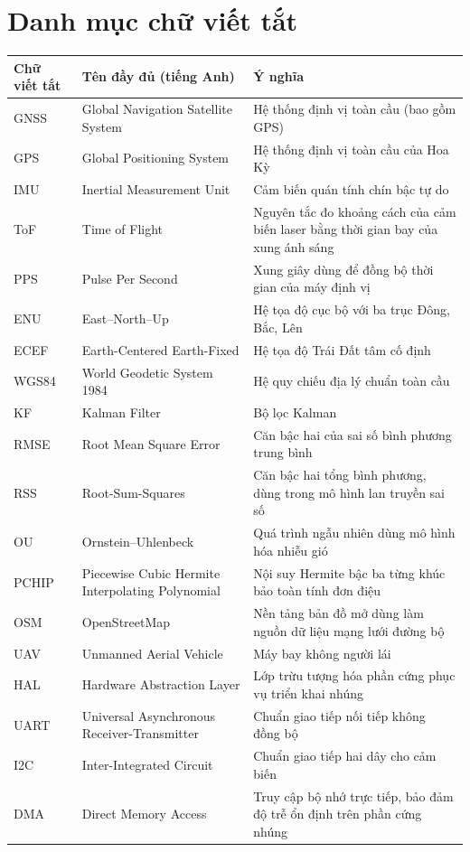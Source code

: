 \section*{Danh mục chữ viết tắt}
\thispagestyle{empty}

\begin{table}[H]
\centering
\small
\begin{tabularx}{\textwidth}{l>{\raggedright\arraybackslash}p{6.2cm}X}
\toprule
\textbf{Chữ viết tắt} & \textbf{Tên đầy đủ (tiếng Anh)} & \textbf{Ý nghĩa} \\
\midrule
GNSS & Global Navigation Satellite System & Hệ thống định vị toàn cầu (bao gồm GPS) \\
GPS & Global Positioning System & Hệ thống định vị toàn cầu của Hoa Kỳ \\
IMU & Inertial Measurement Unit & Cảm biến quán tính chín bậc tự do \\
ToF & Time of Flight & Nguyên tắc đo khoảng cách của cảm biến laser bằng thời gian bay của xung ánh sáng \\
PPS & Pulse Per Second & Xung giây dùng để đồng bộ thời gian của máy định vị \\
ENU & East--North--Up & Hệ tọa độ cục bộ với ba trục Đông, Bắc, Lên \\
ECEF & Earth-Centered Earth-Fixed & Hệ tọa độ Trái Đất tâm cố định \\
WGS84 & World Geodetic System 1984 & Hệ quy chiếu địa lý chuẩn toàn cầu \\
KF & Kalman Filter & Bộ lọc Kalman \\
RMSE & Root Mean Square Error & Căn bậc hai của sai số bình phương trung bình \\
RSS & Root-Sum-Squares & Căn bậc hai tổng bình phương, dùng trong mô hình lan truyền sai số \\
OU & Ornstein--Uhlenbeck & Quá trình ngẫu nhiên dùng mô hình hóa nhiễu gió \\
PCHIP & Piecewise Cubic Hermite Interpolating Polynomial & Nội suy Hermite bậc ba từng khúc bảo toàn tính đơn điệu \\
OSM & OpenStreetMap & Nền tảng bản đồ mở dùng làm nguồn dữ liệu mạng lưới đường bộ \\
UAV & Unmanned Aerial Vehicle & Máy bay không người lái \\
HAL & Hardware Abstraction Layer & Lớp trừu tượng hóa phần cứng phục vụ triển khai nhúng \\
UART & Universal Asynchronous Receiver-Transmitter & Chuẩn giao tiếp nối tiếp không đồng bộ \\
I2C & Inter-Integrated Circuit & Chuẩn giao tiếp hai dây cho cảm biến \\
DMA & Direct Memory Access & Truy cập bộ nhớ trực tiếp, bảo đảm độ trễ ổn định trên phần cứng nhúng \\
\bottomrule
\end{tabularx}
\end{table}

\clearpage
